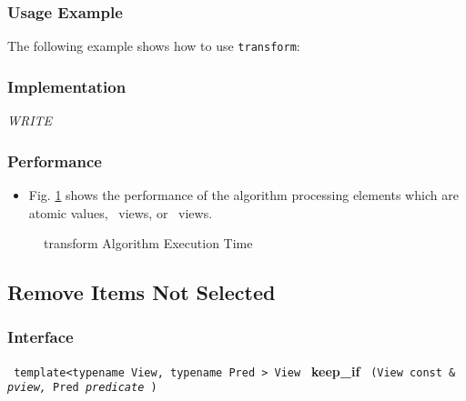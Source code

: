 \subsubsection{Usage Example} %

The following example shows how to use \texttt{transform}:

 
\subsubsection{Implementation} %

\textit{WRITE}

\subsubsection{Performance} %

\begin{itemize}
\item
Fig. \ref{fig:trans-alg-exec-exper}
shows the performance of the algorithm processing
elements which are atomic values, \stl\ views, or \stapl\ views.
\end{itemize}

\begin{figure}[p]
\caption{transform Algorithm Execution Time}
\label{fig:trans-alg-exec-exper}
\end{figure}



\subsection{Remove Items Not Selected} \label{sec-remv-keep_if}

\subsubsection{Interface} %

\noindent
\texttt{%
template<typename View, typename Pred >
\newline
View 
}
\newline
\textbf{keep\_if}%
\texttt{%
(View const \&
\textit{pview,}%
Pred 
\textit{predicate}%
)
}

